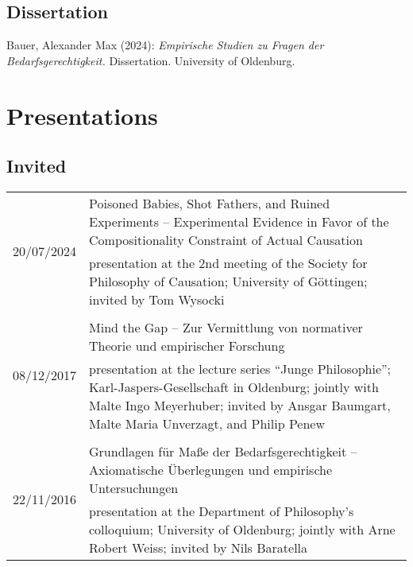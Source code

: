\documentclass[a4paper,10pt]{article}
\newenvironment{literature}{%
   \parskip6pt\parindent0pt\raggedright
   \def\lititem{\hangindent=1cm\hangafter1}}{%
   \par\ignorespaces}
\begin{document}
\subsection*{Dissertation}
\begin{literature}
\lititem Bauer, Alexander Max (2024): \textit{Empirische Studien zu Fragen der Bedarfsgerechtigkeit.} Dissertation. University of Oldenburg.
\end{literature}


\clearpage
\section{Presentations}
\subsection*{Invited}
\begin{longtable}{p{2.25cm}p{11cm}}
\multirow{2}{2.25cm}{\footnotesize{20/07/2024}} & Poisoned Babies, Shot Fathers, and Ruined Experiments -- Experimental Evidence in Favor of the Compositionality Constraint of Actual Causation\\
& \footnotesize{presentation at the 2nd meeting of the Society for Philosophy of Causation; University of Göttingen; invited by Tom Wysocki}\\
\\
\multirow{2}{2.25cm}{\footnotesize{08/12/2017}} & Mind the Gap -- Zur Vermittlung von normativer Theorie und empirischer Forschung\\
& \footnotesize{presentation at the lecture series \enquote{Junge Philosophie}; Karl-Jaspers-Gesellschaft in Oldenburg; jointly with Malte Ingo Meyerhuber; invited by Ansgar Baumgart, Malte Maria Unverzagt, and Philip Penew}\\
\\
\multirow{2}{2.25cm}{\footnotesize{22/11/2016}} & Grundlagen für Maße der Bedarfsgerechtigkeit -- Axiomatische Überlegungen und empirische Untersuchungen\\
& \footnotesize{presentation at the Department of Philosophy's colloquium; University of Oldenburg; jointly with Arne Robert Weiss; invited by Nils Baratella}\\
\end{longtable}
\end{document}
